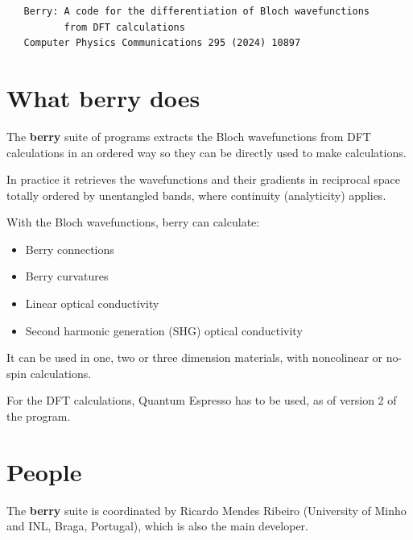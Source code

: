 \documentclass[a4paper,12pt]{report}
\begin{document}
 \begin{verbatim}
   Berry: A code for the differentiation of Bloch wavefunctions
          from DFT calculations
   Computer Physics Communications 295 (2024) 10897
 \end{verbatim}



\section{What \textbf{berry} does}

The \textbf{berry} suite of programs extracts the Bloch wavefunctions from DFT calculations in an ordered way
so they can be directly used to make calculations.

In practice it retrieves the wavefunctions and their gradients in reciprocal space totally ordered
by unentangled bands, where continuity (analyticity) applies.

With the Bloch wavefunctions, berry can calculate:
\begin{itemize}
  \item Berry connections
  \item Berry curvatures
  \item Linear optical conductivity
  \item Second harmonic generation (SHG) optical conductivity
\end{itemize}

It can be used in one, two or three dimension materials, with noncolinear or no-spin calculations.

For the DFT calculations, {\sc Quantum Espresso}\cite{Giannozzi2009,Giannozzi2017} has to be used,
as of version 2 of the program.




\newpage
\section{People}

The \textbf{berry} suite is coordinated by Ricardo Mendes Ribeiro (University of Minho and INL, Braga, Portugal),
which is also the main developer.\medskip
\end{document}

